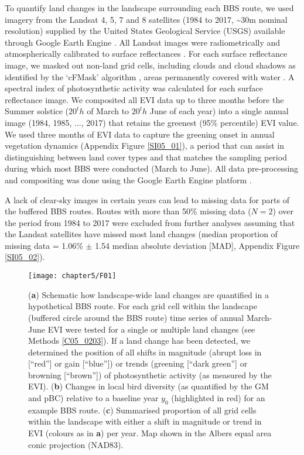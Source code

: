 To quantify land changes in the landscape surrounding each BBS route, we used imagery from the Landsat 4, 5, 7 and 8 satellites (1984 to 2017, \textasciitilde 30m nominal resolution) supplied by the United States Geological Service (USGS) available through Google Earth Engine \citep{Gorelick2017}. All Landsat images were radiometrically \citep{Chander2009} and atmospherically calibrated to surface reflectances \citep{Masek2006}. For each surface reflectance image, we masked out non-land grid cells, including clouds and cloud shadows as identified by the ‘cFMask’ algorithm \citep{Zhu2012}, areas permanently covered with water \citep[> 90\% water occurrence probability in the period 1984 – 2016, ][]{Pekel2016}. A spectral index of photosynthetic activity \citep[the two-band enhanced vegetation index (EVI),][]{Jiang2008} was calculated for each surface reflectance image. We composited all EVI data up to three months before the Summer solstice ($20^th$ of March to $20^th$ June of each year) into a single annual image (1984, 1985, ..., 2017) that retains the greenest (95\% percentile) EVI value. We used three months of EVI data to capture the greening onset in annual vegetation dynamics (Appendix Figure \ref{SI05_01}), a period that can assist in distinguishing between land cover types \citep{Pettorelli2005,Fisher2006,Zhang2006} and that matches the sampling period during which most BBS were conducted (March to June). All data pre-processing and compositing was done using the Google Earth Engine platform \citep{Gorelick2017}.

A lack of clear-sky images in certain years can lead to missing data for parts of the buffered BBS routes. Routes with more than 50\% missing data ($N = 2$) over the period from 1984 to 2017 were excluded from further analyses assuming that the Landsat satellites have missed most land changes (median proportion of missing data = 1.06\% $\pm$ 1.54 median absolute deviation [MAD], Appendix Figure \ref{SI05_02}).

\begin{figure}[htb]
\centering
\texttt{[image: chapter5/F01]}
\caption{ (\textbf{a}) Schematic how landscape-wide land changes are quantified in a hypothetical BBS route. For each grid cell within the landscape (buffered circle around the BBS route) time series of annual March-June EVI were tested for a single or multiple land changes (see Methods \ref{C05_0203}). If a land change has been detected, we determined the position of all shifts in magnitude (abrupt loss in [“red”] or gain [“blue”]) or trends (greening [“dark green”] or browning [“brown”]) of photosynthetic activity (as measured by the EVI). (\textbf{b}) Changes in local bird diversity (as quantified by the GM and pBC) relative to a baseline year $y_0$ (highlighted in red) for an example BBS route. (\textbf{c}) Summarised proportion of all grid cells within the landscape with either a shift in magnitude or trend in EVI (colours as in \textbf{a}) per year. Map shown in the Albers equal area conic projection (NAD83).}
\label{F05_01}
\end{figure}


